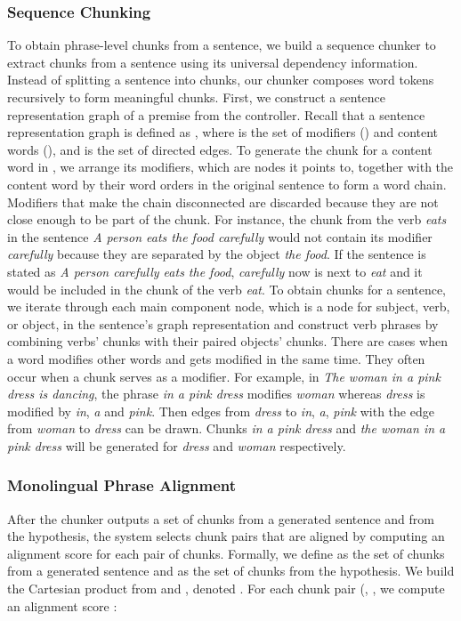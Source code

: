 \documentclass[11pt,a4paper]{article}
\begin{document}
\subsubsection{Sequence Chunking}
 To obtain phrase-level chunks from a sentence, we build a sequence chunker to extract chunks from a sentence using its universal dependency information. Instead of splitting a sentence into chunks, our chunker composes word tokens recursively to form meaningful chunks. First, we construct a sentence representation graph of a premise from the controller. Recall that a sentence representation graph is defined as , where  is the set of modifiers () and content words (), and  is the set of directed edges. To generate the chunk for a content word in , we arrange its modifiers, which are nodes it points to, together with the content word by their word orders in the original sentence to form a word chain. Modifiers that make the chain disconnected are discarded because they are not close enough to be part of the chunk. For instance, the chunk from the verb \textit{eats} in the sentence \textit{A person eats the food carefully} would not contain its modifier \textit{carefully} because they are separated by the object \textit{the food}. If the sentence is stated as \textit{A person carefully eats the food}, \textit{carefully} now is next to \textit{eat} and it would be included in the chunk of the verb \textit{eat}. To obtain chunks for a sentence, we iterate through each main component node, which is a node for subject, verb, or object, in the sentence's graph representation and construct verb phrases by combining verbs' chunks with their paired objects' chunks. There are cases when a word modifies other words and gets modified in the same time. They often occur when a chunk serves as a modifier. For example, in \textit{The woman in a pink dress is dancing}, the phrase \textit{in a pink dress} modifies \textit{woman} whereas \textit{dress} is modified by \textit{in}, \textit{a} and \textit{pink}. Then edges from \textit{dress} to \textit{in}, \textit{a}, \textit{pink} with the edge from \textit{woman} to \textit{dress} can be drawn. Chunks \textit{in a pink dress} and \textit{the woman in a pink dress} will be generated for \textit{dress} and \textit{woman} respectively.
 
 \subsubsection{Monolingual Phrase Alignment}
After the chunker outputs a set of chunks from a generated sentence and from the hypothesis, the system selects chunk pairs that are aligned by computing an alignment score for each pair of chunks. Formally, we define  as the set of chunks from a generated sentence and  as the set of chunks from the hypothesis. We build the Cartesian product from  and , denoted  . For each chunk pair (, , we compute an alignment score
: 
\end{document}
